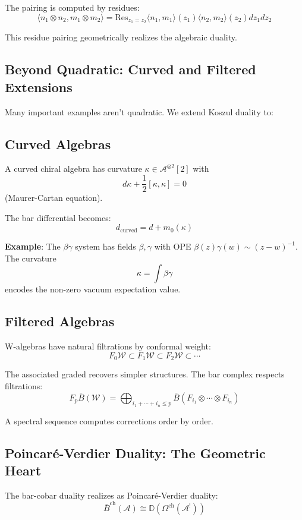 The pairing is computed by residues:
$$\langle n_1 \otimes n_2, m_1 \otimes m_2 \rangle = \text{Res}_{z_1 = z_2} \langle n_1, m_1 \rangle(z_1) \langle n_2, m_2 \rangle(z_2) dz_1 dz_2$$

This residue pairing geometrically realizes the algebraic duality.

\subsection{Beyond Quadratic: Curved and Filtered Extensions}

Many important examples aren't quadratic. We extend Koszul duality to:

\subsection{Curved Algebras}

A curved chiral algebra has curvature $\kappa \in \mathcal{A}^{\otimes 2}[2]$ with
$$d\kappa + \frac{1}{2}[\kappa, \kappa] = 0$$
(Maurer-Cartan equation).

The bar differential becomes:
$$d_{\text{curved}} = d + m_0(\kappa)$$

\textbf{Example}: The $\beta\gamma$ system has fields $\beta, \gamma$ with OPE $\beta(z)\gamma(w) \sim (z-w)^{-1}$. The curvature
$$\kappa = \int \beta\gamma$$
encodes the non-zero vacuum expectation value.

\subsection{Filtered Algebras}  

W-algebras have natural filtrations by conformal weight:
$$F_0 \mathcal{W} \subset F_1 \mathcal{W} \subset F_2 \mathcal{W} \subset \cdots$$

The associated graded recovers simpler structures. The bar complex respects filtrations:
$$F_p\bar{B}(\mathcal{W}) = \bigoplus_{i_1 + \cdots + i_n \leq p} \bar{B}(F_{i_1} \otimes \cdots \otimes F_{i_n})$$

A spectral sequence computes corrections order by order.

\subsection{Poincaré-Verdier Duality: The Geometric Heart}

The bar-cobar duality realizes as Poincaré-Verdier duality:
$$\bar{B}^{\text{ch}}(\mathcal{A}) \cong \mathbb{D}(\Omega^{\text{ch}}(\mathcal{A}^!))$$

